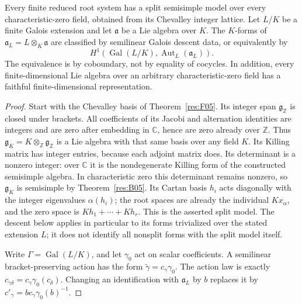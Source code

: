 \begin{proposition}\label{res:J02}
Every finite reduced root system has a split semisimple model over
every characteristic-zero field, obtained from its Chevalley
integer lattice.
Let \(L/K\) be a finite Galois extension and let \(\mathfrak a\) be
a Lie algebra over \(K\). The \(K\)-forms of
\(\mathfrak a_L=L\otimes_K\mathfrak a\) are classified by
semilinear Galois descent data, or equivalently by
\[
 H^1(\operatorname{Gal}(L/K),\operatorname{Aut}_L(\mathfrak a_L)).
\]
The equivalence is by coboundary, not by equality of cocycles.
In addition, every finite-dimensional Lie algebra over an arbitrary
characteristic-zero field has a faithful finite-dimensional representation.
\end{proposition}
\begin{proof}
Start with the Chevalley basis of Theorem~\ref{res:F05}. Its
integer span \(\mathfrak g_{\mathbb Z}\) is closed under brackets.
All coefficients of its Jacobi and alternation identities are
integers and are zero after embedding in \(\mathbb C\), hence are
zero already over \(\mathbb Z\). Thus
\(\mathfrak g_K=K\otimes_{\mathbb Z}\mathfrak g_{\mathbb Z}\)
is a Lie algebra with that same basis over any field \(K\).
Its Killing matrix has integer entries, because each adjoint
matrix does. Its determinant is a nonzero integer: over
\(\mathbb C\) it is the nondegenerate Killing form of the
constructed semisimple algebra. In characteristic zero this
determinant remains nonzero, so \(\mathfrak g_K\) is semisimple
by Theorem~\ref{res:B05}. Its Cartan basis \(h_i\) acts diagonally
with the integer eigenvalues \(\alpha(h_i)\); the root spaces
are already the individual \(Kx_\alpha\), and the zero space
is \(Kh_1+\cdots+Kh_r\). This is the asserted split model.
The descent below applies in particular to its forms trivialized
over the stated extension \(L\); it does not identify all
nonsplit forms with the split model itself.

Write \(\Gamma=\operatorname{Gal}(L/K)\), and let \(\gamma_0\)
act on scalar coefficients. A semilinear bracket-preserving action
has the form \(\widetilde\gamma=c_\gamma\gamma_0\).
The action law is exactly
\(c_{\gamma\delta}=c_\gamma\gamma_0(c_\delta)\).
Changing an identification with \(\mathfrak a_L\) by \(b\)
replaces it by
\(c'_\gamma=b c_\gamma\gamma_0(b)^{-1}\).


\end{proof}
